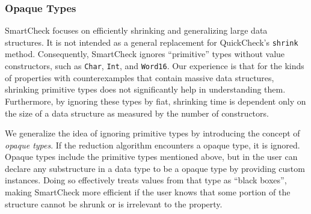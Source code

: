 \documentclass{sigplanconf}
\newenvironment{code}{\begin{alltt}\footnotesize}{\end{alltt}}
\newcommand{\ttp}[1]{\texttt{#1}}
\begin{document}


\subsubsection{Opaque Types}\label{sec:base}

SmartCheck focuses on efficiently shrinking and generalizing large data
structures.  It is not intended as a general replacement for QuickCheck's
\ttp{shrink} method.  Consequently, SmartCheck ignores ``primitive'' types
without value constructors, such as \ttp{Char}, \ttp{Int}, and \ttp{Word16}.
Our experience is that for the kinds of properties with counterexamples that
contain massive data structures, shrinking primitive types does not
significantly help in understanding them.  Furthermore, by ignoring these types
by fiat, shrinking time is dependent only on the size of a data structure as
measured by the number of constructors.

We generalize the idea of ignoring primitive types by introducing the concept of
\emph{opaque types}.  If the reduction algorithm encounters a opaque type, it is
ignored.  Opaque types include the primitive types mentioned above, but in the
user can declare any substructure in a data type to be a opaque type by
providing custom instances.  Doing so effectively treats values from that type
as ``black boxes'', making SmartCheck more efficient if the user knows that some
portion of the structure cannot be shrunk or is irrelevant to the property.
\end{document}
